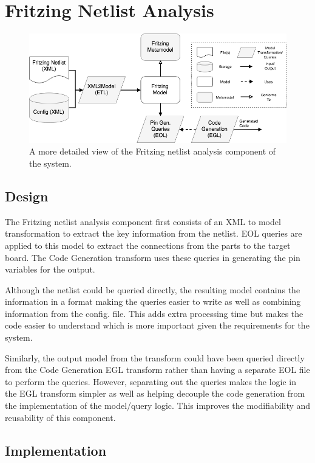 \documentclass{UoYCSproject}
\begin{document}
\section{Fritzing Netlist Analysis} \label{fritz_design}
\begin{figure}[h!]
  \centering
  \includegraphics[width=0.8\linewidth]{graphics/fritzing_analysis.png}
  \caption{A more detailed view of the Fritzing netlist analysis component of the system.}
  \label{fig:fritzing_analysis}
\end{figure}

\subsection{Design}
The Fritzing netlist analysis component first consists of an XML to model transformation to extract the key information from the netlist. EOL queries are applied to this model to extract the connections from the parts to the target board. The Code Generation transform uses these queries in generating the pin variables for the output.

Although the netlist could be queried directly, the resulting model contains the information in a format making the queries easier to write as well as combining information from the config. file. This adds extra processing time but makes the code easier to understand which is more important given the requirements for the system.

Similarly, the output model from the transform could have been queried directly from the Code Generation EGL transform rather than having a separate EOL file to perform the queries. However, separating out the queries makes the logic in the EGL transform simpler as well as helping decouple the code generation from the implementation of the model/query logic. This improves the modifiability and reusability of this component.

\subsection{Implementation}
\end{document}
